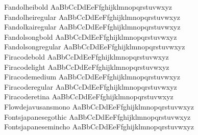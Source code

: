 \begin{tabbing}
Fandolheibold \> { AaBbCcDdEeFfghijklmnopqrstuvwxyz} \\
Fandolheiregular \> { AaBbCcDdEeFfghijklmnopqrstuvwxyz} \\
Fandolkairegular \> { AaBbCcDdEeFfghijklmnopqrstuvwxyz} \\
Fandolsongbold \> { AaBbCcDdEeFfghijklmnopqrstuvwxyz} \\
Fandolsongregular \> { AaBbCcDdEeFfghijklmnopqrstuvwxyz} \\
Firacodebold \> { AaBbCcDdEeFfghijklmnopqrstuvwxyz} \\
Firacodelight \> { AaBbCcDdEeFfghijklmnopqrstuvwxyz} \\
Firacodemedium \> { AaBbCcDdEeFfghijklmnopqrstuvwxyz} \\
Firacoderegular \> { AaBbCcDdEeFfghijklmnopqrstuvwxyz} \\
Firacoderetina \> { AaBbCcDdEeFfghijklmnopqrstuvwxyz} \\
Flowdejavusansmono \> { AaBbCcDdEeFfghijklmnopqrstuvwxyz} \\
Fontsjapanesegothic \> { AaBbCcDdEeFfghijklmnopqrstuvwxyz} \\
Fontsjapanesemincho \> { AaBbCcDdEeFfghijklmnopqrstuvwxyz} \\

\end{tabbing}
